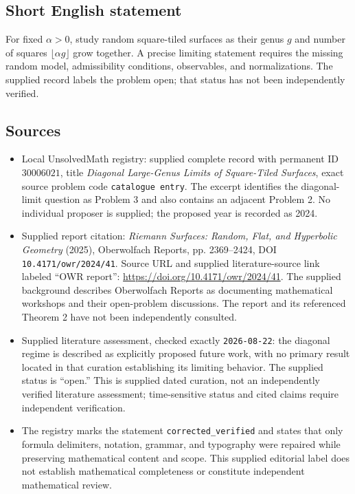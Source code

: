 \documentclass[11pt]{article}
\begin{document}
\subsection{Short English statement}
For fixed \(\alpha>0\), study random square-tiled surfaces as their genus \(g\) and number of squares \(\lfloor\alpha g\rfloor\) grow together. A precise limiting statement requires the missing random model, admissibility conditions, observables, and normalizations. The supplied record labels the problem open; that status has not been independently verified.
\subsection{Sources}
\begin{itemize}
\item Local UnsolvedMath registry: supplied complete record with permanent ID \(30006021\), title \emph{Diagonal Large-Genus Limits of Square-Tiled Surfaces}, exact source problem code \texttt{catalogue entry}. The excerpt identifies the diagonal-limit question as Problem 3 and also contains an adjacent Problem 2. No individual proposer is supplied; the proposed year is recorded as 2024.
\item Supplied report citation: \emph{Riemann Surfaces: Random, Flat, and Hyperbolic Geometry} (2025), Oberwolfach Reports, pp. 2369--2424, DOI \texttt{10.4171/owr/2024/41}. Source URL and supplied literature-source link labeled ``OWR report'': \url{https://doi.org/10.4171/owr/2024/41}. The supplied background describes Oberwolfach Reports as documenting mathematical workshops and their open-problem discussions. The report and its referenced Theorem 2 have not been independently consulted.
\item Supplied literature assessment, checked exactly \texttt{2026-08-22}: the diagonal regime is described as explicitly proposed future work, with no primary result located in that curation establishing its limiting behavior. The supplied status is ``open.'' This is supplied dated curation, not an independently verified literature assessment; time-sensitive status and cited claims require independent verification.
\item The registry marks the statement \texttt{corrected\_verified} and states that only formula delimiters, notation, grammar, and typography were repaired while preserving mathematical content and scope. This supplied editorial label does not establish mathematical completeness or constitute independent mathematical review.
\end{itemize}
\end{document}
